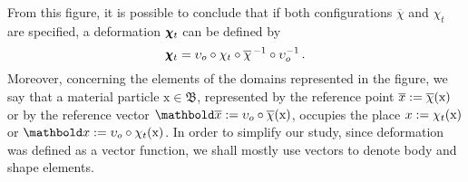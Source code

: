 \begin{figure}[!ht]
\centering
\begin{center}
\scalebox{.72}{}
\end{center}
\label{fg:deformacao}
\end{figure}
From this figure, it is possible to conclude that if both configurations $\overline{\chi}$ and $\chi_t$ are specified, a deformation $\pmb{\chi}_t$ can be defined by 
\begin{equation}
\pmb{\chi}_t = \upsilon_o\circ\chi_t\circ\overline{\chi}^{\,-1}\circ\upsilon_o^{-1}\,.
\end{equation}
Moreover, concerning the elements of the domains represented in the figure, we say that a material particle $\text{x}\in\mathfrak{B}$, represented by the reference point $\overline{x}:=\overline{\chi}(\text{x})$ or by the reference vector $\vto{\overline{x}}:=\fua{\upsilon_o\circ\overline{\chi}}{\text{x}}$, occupies the place $x:=\chi_t(\text{x})$ or $\vto{x}:=\fua{\upsilon_o\circ\chi_t}{\text{x}}$. In order to simplify our study, since deformation was defined as a vector function, we shall mostly use vectors to denote body and shape elements.  

